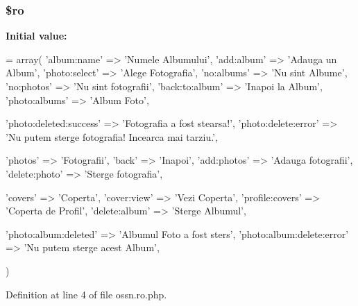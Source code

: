 \subsubsection[{\texorpdfstring{\$ro}{$ro}}]{\setlength{\rightskip}{0pt plus 5cm}\$ro}\hypertarget{components_2_ossn_photos_2locale_2ossn_8ro_8php_ad432e1965f7fa8ce0807b244734e70f8}{}\label{components_2_ossn_photos_2locale_2ossn_8ro_8php_ad432e1965f7fa8ce0807b244734e70f8}
{\bfseries Initial value\+:}
\begin{DoxyCode}
= array(
    \textcolor{stringliteral}{'album:name'} => \textcolor{stringliteral}{'Numele Albumului'},
    \textcolor{stringliteral}{'add:album'} => \textcolor{stringliteral}{'Adauga un Album'},
    \textcolor{stringliteral}{'photo:select'} => \textcolor{stringliteral}{'Alege Fotografia'},
    \textcolor{stringliteral}{'no:albums'} => \textcolor{stringliteral}{'Nu sint Albume'},
    \textcolor{stringliteral}{'no:photos'} => \textcolor{stringliteral}{'Nu sint fotografii'},
    \textcolor{stringliteral}{'back:to:album'} => \textcolor{stringliteral}{'Inapoi la Album'},
    \textcolor{stringliteral}{'photo:albums'} => \textcolor{stringliteral}{'Album Foto'},
    
    \textcolor{stringliteral}{'photo:deleted:success'} => \textcolor{stringliteral}{'Fotografia a fost stearsa!'},
    \textcolor{stringliteral}{'photo:delete:error'} => \textcolor{stringliteral}{'Nu putem sterge fotografia! Incearca mai tarziu.'},
    
    \textcolor{stringliteral}{'photos'} => \textcolor{stringliteral}{'Fotografii'},
    \textcolor{stringliteral}{'back'} => \textcolor{stringliteral}{'Inapoi'},
    \textcolor{stringliteral}{'add:photos'} => \textcolor{stringliteral}{'Adauga fotografii'},
    \textcolor{stringliteral}{'delete:photo'} => \textcolor{stringliteral}{'Sterge fotografia'},
    
    \textcolor{stringliteral}{'covers'} => \textcolor{stringliteral}{'Coperta'},
    \textcolor{stringliteral}{'cover:view'} => \textcolor{stringliteral}{'Vezi Coperta'},
    \textcolor{stringliteral}{'profile:covers'} => \textcolor{stringliteral}{'Coperta de Profil'},
    \textcolor{stringliteral}{'delete:album'} => \textcolor{stringliteral}{'Sterge Albumul'},
    
    \textcolor{stringliteral}{'photo:album:deleted'} => \textcolor{stringliteral}{'Albumul Foto a fost sters'},
    \textcolor{stringliteral}{'photo:album:delete:error'} => \textcolor{stringliteral}{'Nu putem sterge acest Album'},
    

)
\end{DoxyCode}


Definition at line 4 of file ossn.\+ro.\+php.

